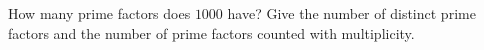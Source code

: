 How many prime factors does $1000$ have? Give the number of distinct prime factors and the number of prime factors counted with multiplicity.
